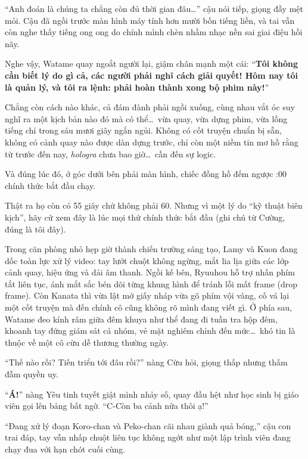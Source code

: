 \documentclass[../main.tex]{subfiles}
\begin{document}

``Anh đoán là chúng ta chẳng còn đủ thời gian đâu\dots'' cậu nói tiếp, giọng đầy mệt mỏi. Cậu đã ngồi trước màn hình máy tính hơn mười bốn tiếng liền, và tai vẫn còn nghe thấy tiếng ong ong do chính mình chèn nhầm nhạc nền sai giai điệu hồi nãy.

Nghe vậy, Watame quay ngoắt người lại, giậm chân mạnh một cái: ``\textbf{Tôi không cần biết lý do gì cả, các người phải nghĩ cách giải quyết! Hôm nay tôi là quản lý, và tôi ra lệnh: phải hoàn thành xong bộ phim này!}''

Chẳng còn cách nào khác, cả đám đành phải ngồi xuống, cùng nhau vắt óc suy nghĩ ra một kịch bản nào đó mà có thể\dots\ vừa quay, vừa dựng phim, vừa lồng tiếng chỉ trong sáu mươi giây ngắn ngủi. Không có cốt truyện chuẩn bị sẵn, không có cảnh quay nào được dàn dựng trước, chỉ còn một niềm tin mơ hồ rằng từ trước đến nay, \textit{hologra} chưa bao giờ\dots\ cần đến sự logic.

Và đúng lúc đó, ở góc dưới bên phải màn hình, chiếc đồng hồ đếm ngược {:00} chính thức bắt đầu chạy.

\ct

Thật ra họ còn có 55 giây chứ không phải 60. Nhưng vì một lý do ``kỹ thuật biên kịch'', hãy cứ xem đây là lúc mọi thứ chính thức bắt đầu (ghi chú từ Cường, đúng là tôi đây).

Trong căn phòng nhỏ hẹp giờ thành chiến trường sáng tạo, Lamy và Kuon đang dốc toàn lực xử lý video: tay lướt chuột không ngừng, mắt lia lịa giữa các lớp cảnh quay, hiệu ứng và dải âm thanh. Ngồi kế bên, Ryuuhou hỗ trợ nhấn phím tắt liên tục, ánh mắt sắc bén dõi từng khung hình để tránh lỗi mất frame (drop frame). Còn Kanata thì vừa lật mớ giấy nháp vừa gõ phím vội vàng, cố vá lại một cốt truyện mà đến chính cô cũng không rõ mình đang viết gì. Ở phía sau, Watame đeo kính râm giữa đêm khuya như thể đang đi tuần tra hộp đêm, khoanh tay đứng giám sát cả nhóm, vẻ mặt nghiêm chỉnh đến mức\dots\ khó tin là thuộc về một cô cừu dễ thương thường ngày.


``Thế nào rồi? Tiến triển tới đâu rồi?'' nàng Cừu hỏi, giọng thấp nhưng thấm đẫm quyền uy.

``\textbf{Á!}'' nàng Yêu tinh tuyết giật mình nhảy số, quay đầu hệt như học sinh bị giáo viên gọi lên bảng bất ngờ. ``C-Còn ba cảnh nữa thôi ạ!''

``Đang xử lý đoạn Koro-chan và Peko-chan cãi nhau giành quả bóng,'' cậu con trai đáp, tay vẫn nhấp chuột liên tục không ngớt như một lập trình viên đang chạy đua với hạn chót cuối cùng.
\end{document}
